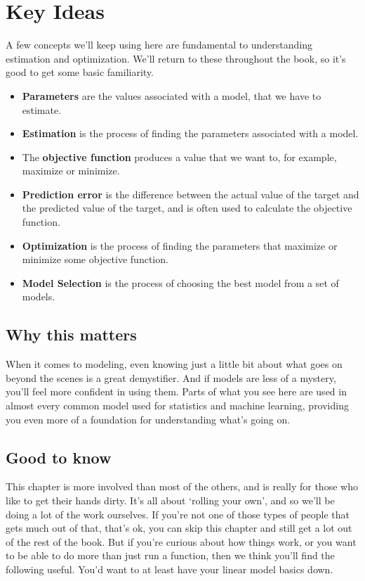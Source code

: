 \documentclass[
  letterpaper,
]{krantz}
\providecommand{\tightlist}{%
  \setlength{\itemsep}{0pt}\setlength{\parskip}{0pt}}\usepackage{longtable,booktabs,array}
\begin{document}
\section{Key Ideas}\label{sec-estim-key-ideas}

A few concepts we'll keep using here are fundamental to understanding
estimation and optimization. We'll return to these throughout the book,
so it's good to get some basic familiarity.

\begin{itemize}
\tightlist
\item
  \textbf{Parameters} are the values associated with a model, that we
  have to estimate.
\item
  \textbf{Estimation} is the process of finding the parameters
  associated with a model.
\item
  The \textbf{objective function} produces a value that we want to, for
  example, maximize or minimize.
\item
  \textbf{Prediction error} is the difference between the actual value
  of the target and the predicted value of the target, and is often used
  to calculate the objective function.
\item
  \textbf{Optimization} is the process of finding the parameters that
  maximize or minimize some objective function.
\item
  \textbf{Model Selection} is the process of choosing the best model
  from a set of models.
\end{itemize}

\subsection{Why this matters}\label{sec-estim-why}

When it comes to modeling, even knowing just a little bit about what
goes on beyond the scenes is a great demystifier. And if models are less
of a mystery, you'll feel more confident in using them. Parts of what
you see here are used in almost every common model used for statistics
and machine learning, providing you even more of a foundation for
understanding what's going on.

\subsection{Good to know}\label{sec-estim-good-to-know}

This chapter is more involved than most of the others, and is really for
those who like to get their hands dirty. It's all about `rolling your
own', and so we'll be doing a lot of the work ourselves. If you're not
one of those types of people that gets much out of that, that's ok, you
can skip this chapter and still get a lot out of the rest of the book.
But if you're curious about how things work, or you want to be able to
do more than just run a function, then we think you'll find the
following useful. You'd want to at least have your linear model basics
down.
\end{document}
